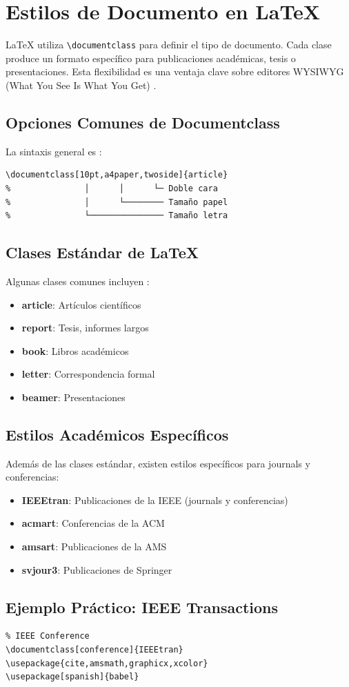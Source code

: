 \section{Estilos de Documento en LaTeX}

\LaTeX{} utiliza \texttt{\textbackslash documentclass} para definir el tipo de documento. Cada clase produce un formato específico para publicaciones académicas, tesis o presentaciones. Esta flexibilidad es una ventaja clave sobre editores WYSIWYG (What You See Is What You Get) \cite{latex_project}.

\subsection{Opciones Comunes de Documentclass}

La sintaxis general es \cite{latex_project}:

\begin{verbatim}
\documentclass[10pt,a4paper,twoside]{article}
%               │      │      └─ Doble cara
%               │      └──────── Tamaño papel
%               └─────────────── Tamaño letra
\end{verbatim}

\subsection{Clases Estándar de \LaTeX}

Algunas clases comunes incluyen \cite{latex_project}:

\begin{itemize}
  \item \textbf{article}: Artículos científicos
  \item \textbf{report}: Tesis, informes largos
  \item \textbf{book}: Libros académicos
  \item \textbf{letter}: Correspondencia formal
  \item \textbf{beamer}: Presentaciones
\end{itemize}

\subsection{Estilos Académicos Específicos}

Además de las clases estándar, existen estilos específicos para journals y conferencias:

\begin{itemize}
  \item \textbf{IEEEtran}: Publicaciones de la IEEE (journals y conferencias) \cite{ieeetran_doc}
  \item \textbf{acmart}: Conferencias de la ACM \cite{acmart_class}
  \item \textbf{amsart}: Publicaciones de la AMS \cite{amslatex}
  \item \textbf{svjour3}: Publicaciones de Springer \cite{springer_svjour}
\end{itemize}

\subsection{Ejemplo Práctico: IEEE Transactions}

\begin{verbatim}
% IEEE Conference
\documentclass[conference]{IEEEtran}
\usepackage{cite,amsmath,graphicx,xcolor}
\usepackage[spanish]{babel}
\end{verbatim}